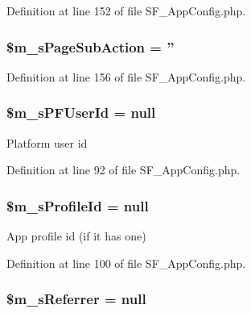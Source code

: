 Definition at line 152 of file SF\_\-AppConfig.php.

\hypertarget{classSF__AppConfig_a980e6fd9e83172281b1e6dac50f16e9c}{
\subsubsection[{\$m\_\-sPageSubAction}]{\setlength{\rightskip}{0pt plus 5cm}\$m\_\-sPageSubAction = ''}}
\label{classSF__AppConfig_a980e6fd9e83172281b1e6dac50f16e9c}


Definition at line 156 of file SF\_\-AppConfig.php.

\hypertarget{classSF__AppConfig_aca2665de105ba9e1a89b58722bd21f16}{
\subsubsection[{\$m\_\-sPFUserId}]{\setlength{\rightskip}{0pt plus 5cm}\$m\_\-sPFUserId = null}}
\label{classSF__AppConfig_aca2665de105ba9e1a89b58722bd21f16}
Platform user id 

Definition at line 92 of file SF\_\-AppConfig.php.

\hypertarget{classSF__AppConfig_a935f137fe74f4707be2d81593c3a624d}{
\subsubsection[{\$m\_\-sProfileId}]{\setlength{\rightskip}{0pt plus 5cm}\$m\_\-sProfileId = null}}
\label{classSF__AppConfig_a935f137fe74f4707be2d81593c3a624d}
App profile id (if it has one) 

Definition at line 100 of file SF\_\-AppConfig.php.

\hypertarget{classSF__AppConfig_a251ed856d45aa28d717a012291b71d26}{
\subsubsection[{\$m\_\-sReferrer}]{\setlength{\rightskip}{0pt plus 5cm}\$m\_\-sReferrer = null}}
\label{classSF__AppConfig_a251ed856d45aa28d717a012291b71d26}


